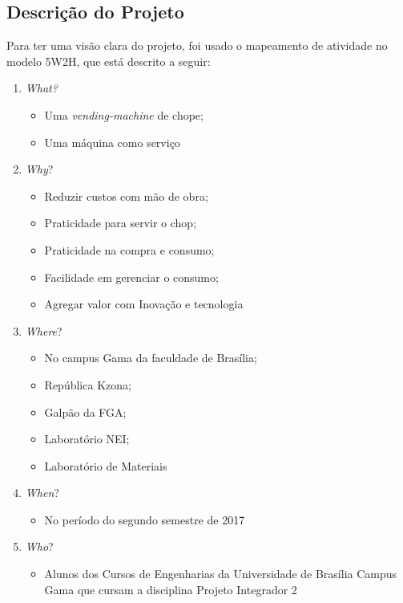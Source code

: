 		\subsection[Descrição do Projeto]{Descrição do Projeto}
			Para ter uma visão clara do projeto, foi usado o mapeamento de atividade no modelo 5W2H, que está descrito 
			a seguir:
			\begin{enumerate}
				\item \textit{What?}
					\begin{itemize}
						\item Uma \textit{vending-machine} de chope;
						\item Uma máquina como serviço
					\end{itemize}
				\item \textit{Why}?
					\begin{itemize}
						\item Reduzir custos com mão de obra;
						\item Praticidade para servir o chop;
						\item Praticidade na compra e consumo;
						\item Facilidade em gerenciar o consumo;
						\item Agregar valor com Inovação e tecnologia	
					\end{itemize}
				\item \textit{Where}?
					\begin{itemize}
						\item No campus Gama da faculdade de Brasília;
						\item República Kzona;
						\item Galpão da FGA;
						\item Laboratório NEI;
						\item Laboratório de Materiais
					\end{itemize}
				\item \textit{When}?
					\begin{itemize}
						\item No período do segundo semestre de 2017
					\end{itemize}
				\item \textit{Who}?
					\begin{itemize}
						\item Alunos dos Cursos de Engenharias da Universidade de Brasília Campus Gama que cursam a 	disciplina Projeto Integrador 2
					\end{itemize}
			\end{enumerate}

